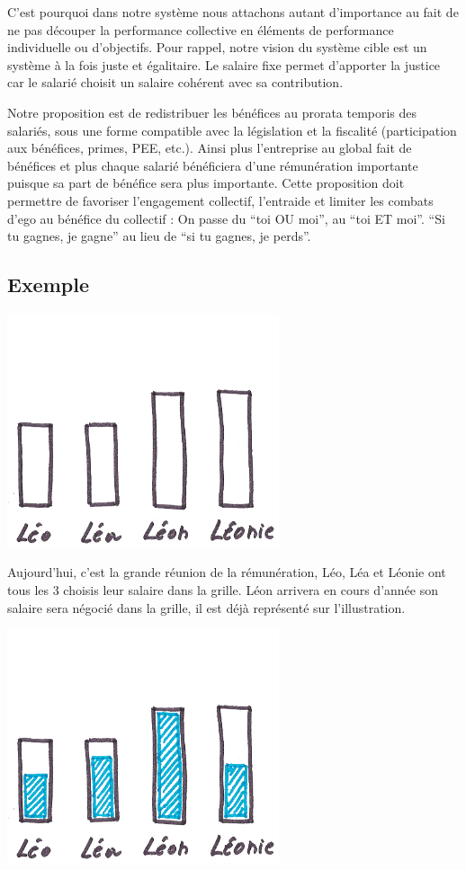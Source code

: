 \documentclass[12pt]{article}
\begin{document}
 C’est pourquoi dans notre système nous attachons autant d’importance au fait de ne pas découper la performance collective en éléments de performance individuelle ou d'objectifs. Pour rappel, notre vision du système cible est un système à la fois juste et égalitaire. Le salaire fixe permet d’apporter la justice car le salarié choisit un salaire cohérent avec sa contribution. 

 Notre proposition est de redistribuer les bénéfices au prorata temporis des salariés, sous une forme compatible avec la législation et la fiscalité (participation aux bénéfices, primes, PEE, etc.).  Ainsi plus l'entreprise au global fait de bénéfices et plus chaque salarié bénéficiera d'une rémunération importante puisque sa part de bénéfice sera plus importante. Cette proposition doit permettre de favoriser l’engagement collectif, l’entraide et limiter les combats d’ego au bénéfice du collectif : On passe du “toi OU moi”, au “toi ET moi”. “Si tu gagnes, je gagne” au lieu de “si tu gagnes, je perds”.

\subsection{Exemple}

 \begin{center}
 \includegraphics[width=0.6\textwidth]{includes/choix_salaires}
 \end{center}

 Aujourd'hui, c'est la grande réunion de la rémunération, Léo, Léa et Léonie ont tous les 3 choisis leur salaire dans la grille. Léon arrivera en cours d’année son salaire sera négocié dans la grille, il est déjà représenté sur l'illustration.

 \begin{center}
 \includegraphics[width=0.6\textwidth]{includes/choix_part_fixe}
 \end{center}
\end{document}
